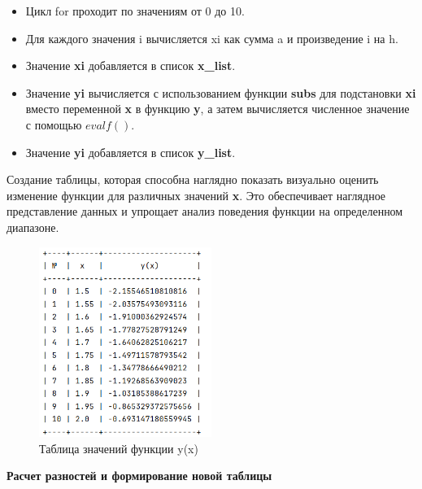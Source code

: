 \documentclass{article}
\begin{document}
\begin{itemize}
    \item Цикл for проходит по значениям от 0 до 10.
    \item Для каждого значения i вычисляется xi как сумма a и произведение i на h.
    \item Значение \textbf{xi} добавляется в список \textbf{x\_list}.
    \item Значение \textbf{yi} вычисляется с использованием функции \textbf{subs} для подстановки  \textbf{xi} вместо переменной \textbf{x} в функцию \textbf{y}, а затем вычисляется численное значение с помощью  \textbf{$evalf()$}.
    \item Значение \textbf{yi} добавляется в список \textbf{y\_list}.

\end{itemize}

Создание таблицы, которая способна наглядно показать визуально оценить изменение функции для различных значений \textbf{x}. Это обеспечивает наглядное представление данных и упрощает анализ поведения функции на определенном диапазоне. 

\begin{figure}[h]
    \centering
    \includegraphics[width=0.5\textwidth]{t_lab_2_1.png}
    \caption{Таблица значений функции y(x)}
    \label{fig:my_label}
\end{figure}


\vspace{18\baselineskip}

\textbf{\large{Расчет разностей и формирование новой таблицы}}
\end{document}
